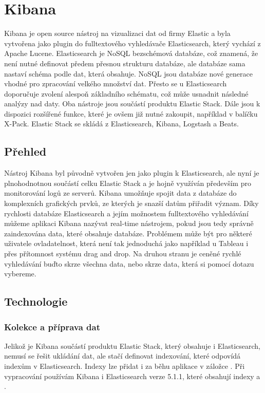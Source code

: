 \documentclass[czech,BP]{thesiskiv}
\begin{document}
 
 
 \section{Kibana}
 Kibana je open source nástroj na vizualizaci dat od firmy Elastic a byla vytvořena jako plugin do fulltextového vyhledávače Elasticsearch, který vychází z Apache Lucene. Elasticsearch je NoSQL bezschémová databáze, což znamená, že není nutné definovat předem přesnou strukturu databáze, ale databáze sama nastaví schéma podle dat, která obsahuje. NoSQL jsou databáze nové generace vhodné pro zpracování velkého množství dat.\cite{NoSQL} Přesto se u Elasticsearch doporučuje zvolení alespoň základního schématu, což může usnadnit následné analýzy nad daty.\cite{SchemaElastic} Oba nástroje jsou součástí produktu Elastic Stack. Dále jsou k  dispozici rozšířené funkce, které je ovšem již nutné zakoupit, například v balíčku X-Pack. Elastic Stack se skládá z Elasticsearch, Kibana, Logstash a Beats.
 
 \subsection{Přehled}
 Nástroj Kibana byl původně vytvořen jen jako plugin k Elasticsearch, ale nyní je plnohodnotnou součástí celku Elastic Stack a je hojně využíván především pro monitorování logů ze serverů. Kibana umožňuje spojit data z databáze do komplexních grafických prvků, ze kterých je snazší datům přiřadit význam. Díky rychlosti databáze Elasticsearch a jejím možnostem fulltextového vyhledávání můžeme aplikaci Kibana nazývat real-time nástrojem, pokud jsou tedy správně zaindexována data, které obsahuje databáze. Problémem může být pro některé uživatele ovladatelnost, která není tak jednoduchá jako například u Tableau i přes přítomnost systému drag and drop. Na druhou stranu je ceněné rychlé vyhledávání buďto skrze všechna data, nebo skrze data, která si pomocí dotazu vybereme.

 \subsection{Technologie}
 \subsubsection{Kolekce a příprava dat}
 Jelikož je Kibana součástí produktu Elastic Stack, který obsahuje i Elasticsearch, nemusí se řešit ukládání dat, ale stačí definovat indexování, které odpovídá indexům v Elasticsearch. Indexy lze přidat i za běhu aplikace v záložce . Při vypracování používám Kibana i Elasticsearch verze 5.1.1, které obsahují indexy  a .
\end{document}
